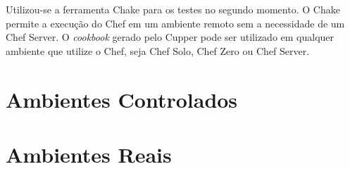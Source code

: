 Utilizou-se a ferramenta Chake para os testes no segundo momento. O Chake
permite a execução do Chef em um ambiente remoto sem a necessidade de um
Chef Server. O \textit{cookbook} gerado pelo Cupper pode ser utilizado em qualquer
ambiente que utilize o Chef, seja Chef Solo, Chef Zero ou Chef Server.

\section{Ambientes Controlados}


\section{Ambientes Reais}



